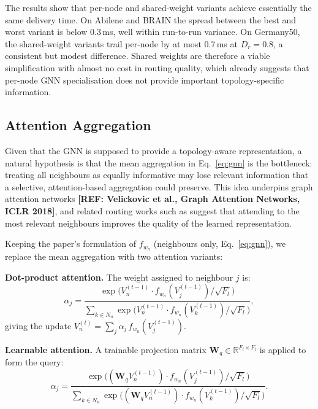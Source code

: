 \documentclass[10pt,twocolumn,letterpaper]{article}
\begin{document}
The results show that per-node and shared-weight variants achieve essentially the same delivery time. On Abilene and BRAIN the spread between the best and worst variant is below 0.3\,ms, well within run-to-run variance. On Germany50, the shared-weight variants trail per-node by at most 0.7\,ms at $D_r = 0.8$, a consistent but modest difference. Shared weights are therefore a viable simplification with almost no cost in routing quality, which already suggests that per-node GNN specialisation does not provide important topology-specific information.

\subsection{Attention Aggregation}
\label{sec:attn}

Given that the GNN is supposed to provide a topology-aware representation, a natural hypothesis is that the mean aggregation in Eq.~\eqref{eq:gnn} is the bottleneck: treating all neighbours as equally informative may lose relevant information that a selective, attention-based aggregation could preserve. This idea underpins graph attention networks \textbf{[REF: Velickovic et al., Graph Attention Networks, ICLR 2018]}, and related routing works such as \cite{autognn} suggest that attending to the most relevant neighbours improves the quality of the learned representation.

Keeping the paper's formulation of $f_{w_n}$ (neighbours only, Eq.~\eqref{eq:gnn}), we replace the mean aggregation with two attention variants:

\textbf{Dot-product attention.} The weight assigned to neighbour $j$ is:
\begin{equation}
  \alpha_j = \frac{
    \exp\!\bigl(V_n^{(t-1)} \cdot f_{w_n}(V_j^{(t-1)}) / \sqrt{F_l}\bigr)
  }{
    \sum_{k \in N_n} \exp\!\bigl(V_n^{(t-1)} \cdot f_{w_n}(V_k^{(t-1)}) / \sqrt{F_l}\bigr)
  },
  \label{eq:dot-attn}
\end{equation}
giving the update $V_n^{(t)} = \sum_j \alpha_j \, f_{w_n}(V_j^{(t-1)})$.

\textbf{Learnable attention.} A trainable projection matrix $\mathbf{W}_q \in \mathbb{R}^{F_l \times F_l}$ is applied to form the query:
\begin{equation}
  \alpha_j = \frac{
    \exp\!\bigl((\mathbf{W}_q V_n^{(t-1)}) \cdot f_{w_n}(V_j^{(t-1)}) / \sqrt{F_l}\bigr)
  }{
    \sum_{k \in N_n} \exp\!\bigl((\mathbf{W}_q V_n^{(t-1)}) \cdot f_{w_n}(V_k^{(t-1)}) / \sqrt{F_l}\bigr)
  }.
  \label{eq:learn-attn}
\end{equation}
\end{document}
